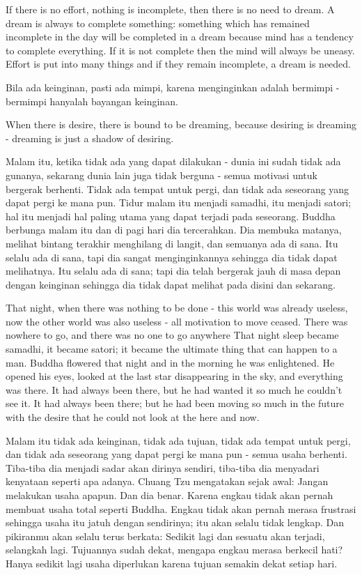 \english
If there is no effort, nothing is incomplete, then there is no need to dream. A dream is always to complete something: something which has remained incomplete in the day will be completed in a dream because mind has a tendency to complete everything. If it is not complete then the mind will always be uneasy. Effort is put into many things and if they remain incomplete, a dream is needed.

\bahasa
Bila ada keinginan, pasti ada mimpi, karena menginginkan adalah bermimpi - bermimpi hanyalah bayangan keinginan.

\english
When there is desire, there is bound to be dreaming, because desiring is dreaming - dreaming is just a shadow of desiring.

\bahasa
Malam itu, ketika tidak ada yang dapat dilakukan - dunia ini sudah tidak ada gunanya, sekarang dunia lain juga tidak berguna - semua motivasi untuk bergerak berhenti. Tidak ada tempat untuk pergi, dan tidak ada seseorang yang dapat pergi ke mana pun. Tidur malam itu menjadi samadhi, itu menjadi satori; hal itu menjadi hal paling utama yang dapat terjadi pada seseorang. Buddha berbunga malam itu dan di pagi hari dia tercerahkan. Dia membuka matanya, melihat bintang terakhir menghilang di langit, dan semuanya ada di sana. Itu selalu ada di sana, tapi dia sangat menginginkannya sehingga dia tidak dapat melihatnya. Itu selalu ada di sana; tapi dia telah bergerak jauh di masa depan dengan keinginan sehingga dia tidak dapat melihat pada disini dan sekarang.

\english
That night, when there was nothing to be done - this world was already useless, now the other world was also useless - all motivation to move ceased. There was nowhere to go, and there was no one to go anywhere That night sleep became samadhi, it became satori; it became the ultimate thing that can happen to a man. Buddha flowered that night and in the morning he was enlightened. He opened his eyes, looked at the last star disappearing in the sky, and everything was there. It had always been there, but he had wanted it so much he couldn't see it. It had always been there; but he had been moving so much in the future with the desire that he could not look at the here and now.

\bahasa
Malam itu tidak ada keinginan, tidak ada tujuan, tidak ada tempat untuk pergi, dan tidak ada seseorang yang dapat pergi ke mana pun - semua usaha berhenti. Tiba-tiba dia menjadi sadar akan dirinya sendiri, tiba-tiba dia menyadari kenyataan seperti apa adanya. Chuang Tzu mengatakan sejak awal: Jangan melakukan usaha apapun. Dan dia benar. Karena engkau tidak akan pernah membuat usaha total seperti Buddha. Engkau tidak akan pernah merasa frustrasi sehingga usaha itu jatuh dengan sendirinya; itu akan selalu tidak lengkap. Dan pikiranmu akan selalu terus berkata: Sedikit lagi dan sesuatu akan terjadi, selangkah lagi. Tujuannya sudah dekat, mengapa engkau merasa berkecil hati? Hanya sedikit lagi usaha diperlukan karena tujuan semakin dekat setiap hari.

